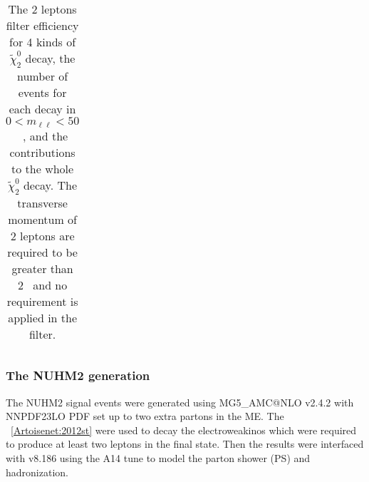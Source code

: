\begin{table}[htb]
\begin{center}
{\begin{tabular}{cccccc}
                \hline
                \hline
            \end{tabular}
        }
    \end{center}
    \caption{The 2 leptons filter efficiency for 4 kinds of $\widetilde{\chi}^{0}_{2}$ decay, the number of events for each decay in $0 < m_{\ell\ell} < 50$~{\GeV}, and the contributions to the whole $\tilde{\chi}^{0}_{2}$ decay.
    The transverse momentum of 2 leptons are required to be greater than 2~{\GeV} and no \met requirement is applied in the filter.}
    \label{tab:data_nuhm2_n2_decay_efficiency_and_percentage}
\end{table}%


\subsubsection{The NUHM2 generation}
\label{subsubsec:data_NUHM2_generation}
The NUHM2 signal events were generated using MG5\_{\scriptsize A}MC@NLO v2.4.2 with NNPDF23LO PDF set up to two extra partons in the ME.
The {\MADSPIN}~\ref{Artoisenet:2012st} were used to decay the electroweakinos which were required to produce at least two leptons in the final state.
Then the results were interfaced with {\PYTHIA} v8.186 using the A14 tune to model the parton shower (PS) and hadronization.
